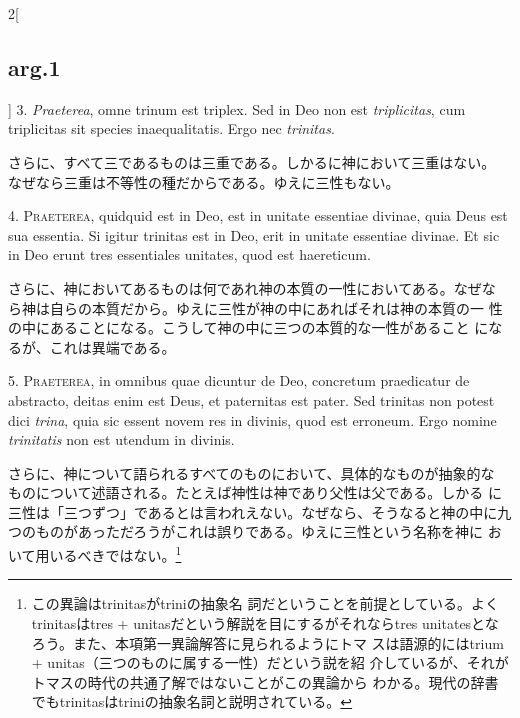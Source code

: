 \documentclass[paper=a4paper,fontsize=10pt,jafontsize=9pt,titlepage]{jlreq}
\begin{document}
\begin{paracol}{2}[\subsection{arg.1}]
3. {\itshape Praeterea}, omne trinum est triplex. Sed in Deo non est {\itshape triplicitas},
cum triplicitas sit species inaequalitatis. Ergo nec {\itshape trinitas}.

\switchcolumn

さらに、すべて三であるものは三重である。しかるに神において三重はない。
 なぜなら三重は不等性の種だからである。ゆえに三性もない。


4. {\scshape Praeterea}, quidquid est in Deo, est in unitate essentiae divinae, quia
Deus est sua essentia. Si igitur trinitas est in Deo, erit in unitate
essentiae divinae. Et sic in Deo erunt tres essentiales unitates, quod
est haereticum.

\switchcolumn

さらに、神においてあるものは何であれ神の本質の一性においてある。なぜな
 ら神は自らの本質だから。ゆえに三性が神の中にあればそれは神の本質の一
 性の中にあることになる。こうして神の中に三つの本質的な一性があること
 になるが、これは異端である。


5. {\scshape Praeterea}, in omnibus quae dicuntur de Deo, concretum praedicatur de
abstracto, deitas enim est Deus, et paternitas est pater. Sed trinitas
non potest dici {\itshape trina}, quia sic essent novem res in divinis, quod est
erroneum. Ergo nomine {\itshape trinitatis} non est utendum in divinis.

\switchcolumn

さらに、神について語られるすべてのものにおいて、具体的なものが抽象的な
 ものについて述語される。たとえば神性は神であり父性は父である。しかる
 に三性は「三つずつ」であるとは言われえない。なぜなら、そうなると神の中に九
 つのものがあっただろうがこれは誤りである。ゆえに三性という名称を神に
 おいて用いるべきではない。\footnote{この異論はtrinitasがtriniの抽象名
 詞だということを前提としている。よくtrinitasはtres +
 unitasだという解説を目にするがそれならtres unitatesとなろう。また、本項第一異論解答に見られるようにトマ
 スは語源的にはtrium + unitas（三つのものに属する一性）だという説を紹
 介しているが、それがトマスの時代の共通了解ではないことがこの異論から
 わかる。現代の辞書でもtrinitasはtriniの抽象名詞と説明されている。}


\end{paracol}
\end{document}
